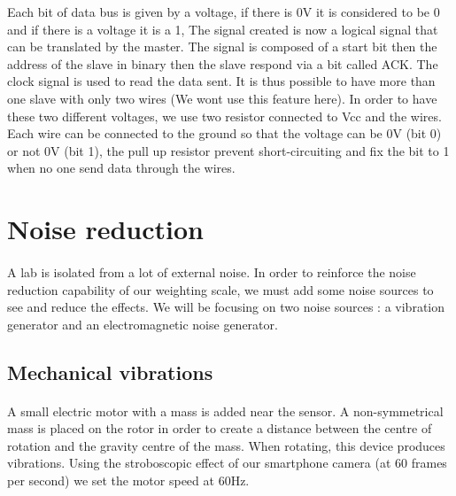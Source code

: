 \documentclass{article}[12pt]
\begin{document}
Each bit of data bus is given by a voltage, if there is 0V it is considered to be 0 and if there is a voltage it is a 1,
The signal created is now a logical signal that can be translated by the master.
The signal is composed of a start bit then the address of the slave in binary then the slave respond via a bit called ACK.
The clock signal is used to read the data sent.
It is thus possible to have more than one slave with only two wires (We wont use this feature here).
In order to have these two different voltages, we use two resistor connected to Vcc and the wires.
Each wire can be connected to the ground so that the voltage can be 0V (bit 0) or not 0V (bit 1), the pull up resistor prevent short-circuiting and fix the bit to 1 when no one send data through the wires.
\section{Noise reduction}
\paragraph{}
A lab is isolated from a lot of external noise. In order to reinforce the noise reduction capability of our weighting scale, we must add some noise sources to see and reduce the effects. We will be focusing on two noise sources : a vibration generator and an electromagnetic noise generator.
\subsection{Mechanical vibrations}
\paragraph{}
A small electric motor with a mass is added near the sensor. A non-symmetrical mass is placed on the rotor in order to create a distance between the centre of rotation and the gravity centre of the mass. When rotating, this device produces vibrations. Using the stroboscopic effect of our smartphone camera (at 60 frames per second) we set the motor speed at 60Hz.
\end{document}
